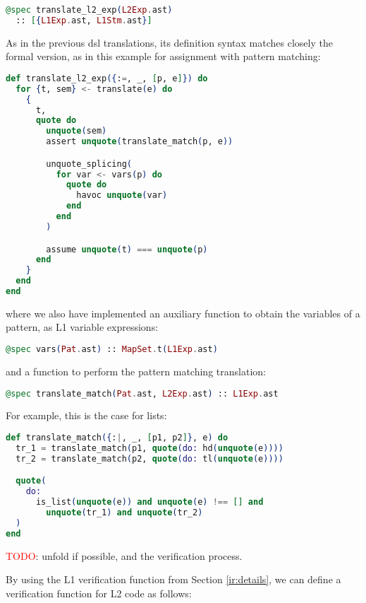 \begin{lstlisting}[language=elixir,numbers=none,frame=none]
@spec translate_l2_exp(L2Exp.ast) 
  :: [{L1Exp.ast, L1Stm.ast}]
\end{lstlisting}

As in the previous \gls{dsl} translations, its definition syntax matches closely the 
formal version, as in this example for assignment with pattern matching:

\begin{lstlisting}[language=elixir,numbers=none,frame=none]
def translate_l2_exp({:=, _, [p, e]}) do
  for {t, sem} <- translate(e) do
    {
      t,
      quote do
        unquote(sem)
        assert unquote(translate_match(p, e))

        unquote_splicing(
          for var <- vars(p) do
            quote do
              havoc unquote(var)
            end
          end
        )

        assume unquote(t) === unquote(p)
      end
    }
  end
end
\end{lstlisting}

where we also have implemented an auxiliary function to obtain the variables of a 
pattern, as L1 variable expressions:

\begin{lstlisting}[language=elixir,numbers=none,frame=none]
@spec vars(Pat.ast) :: MapSet.t(L1Exp.ast)
\end{lstlisting}

and a function to perform the pattern matching translation:

\begin{lstlisting}[language=elixir,numbers=none,frame=none]
@spec translate_match(Pat.ast, L2Exp.ast) :: L1Exp.ast
\end{lstlisting}

For example, this is the case for lists:

\begin{lstlisting}[language=elixir,numbers=none,frame=none]
def translate_match({:|, _, [p1, p2]}, e) do
  tr_1 = translate_match(p1, quote(do: hd(unquote(e))))
  tr_2 = translate_match(p2, quote(do: tl(unquote(e))))

  quote(
    do:
      is_list(unquote(e)) and unquote(e) !== [] and
        unquote(tr_1) and unquote(tr_2)
  )
end
\end{lstlisting}

\textcolor{red}{TODO}: unfold if possible, and the verification process.

By using the L1 verification function from Section \ref{ir:details}, we can
define a verification function for L2 code as follows:

